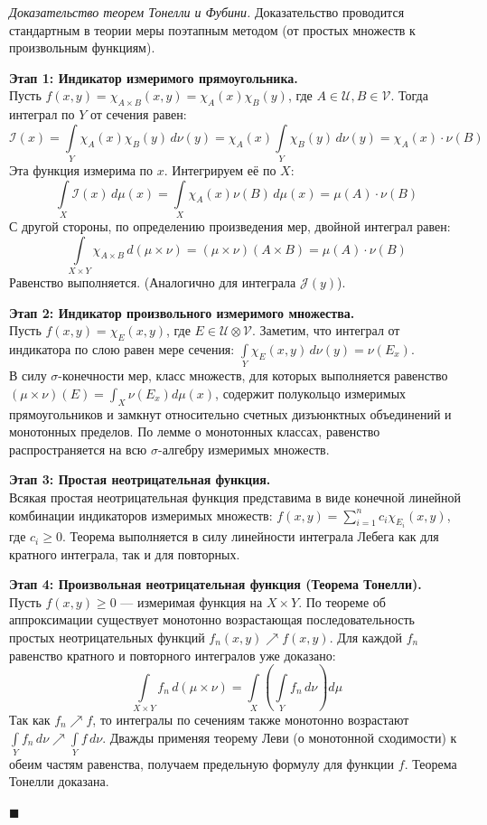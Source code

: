 \documentclass[12pt,a4paper]{article}
\newenvironment{Proof}[1][Доказательство]{\vspace{0.5em}\noindent\textit{#1.}\hspace{0.5em}\ignorespaces}{\hfill$\blacksquare$\vspace{1em}}
\begin{document}
\begin{Proof}[Доказательство теорем Тонелли и Фубини]
Доказательство проводится стандартным в теории меры поэтапным методом (от простых множеств к произвольным функциям).

\textbf{Этап 1: Индикатор измеримого прямоугольника.} \\
Пусть $f(x,y) = \chi_{A \times B}(x,y) = \chi_A(x) \chi_B(y)$, где $A \in \mathcal{U}, B \in \mathcal{V}$. 
Тогда интеграл по $Y$ от сечения равен:
$$ \mathcal{I}(x) = \int\limits_Y \chi_A(x) \chi_B(y) \, d\nu(y) = \chi_A(x) \int\limits_Y \chi_B(y) \, d\nu(y) = \chi_A(x) \cdot \nu(B) $$
Эта функция измерима по $x$. Интегрируем её по $X$:
$$ \int\limits_X \mathcal{I}(x) \, d\mu(x) = \int\limits_X \chi_A(x) \nu(B) \, d\mu(x) = \mu(A) \cdot \nu(B) $$
С другой стороны, по определению произведения мер, двойной интеграл равен:
$$ \int\limits_{X \times Y} \chi_{A \times B} \, d(\mu \times \nu) = (\mu \times \nu)(A \times B) = \mu(A) \cdot \nu(B) $$
Равенство выполняется. (Аналогично для интеграла $\mathcal{J}(y)$).

\textbf{Этап 2: Индикатор произвольного измеримого множества.} \\
Пусть $f(x,y) = \chi_E(x,y)$, где $E \in \mathcal{U} \otimes \mathcal{V}$. Заметим, что интеграл от индикатора по слою равен мере сечения: $\int\limits_Y \chi_E(x,y) \, d\nu(y) = \nu(E_x)$. \\
В силу $\sigma$-конечности мер, класс множеств, для которых выполняется равенство $(\mu \times \nu)(E) = \int_X \nu(E_x) d\mu(x)$, содержит полукольцо измеримых прямоугольников и замкнут относительно счетных дизъюнктных объединений и монотонных пределов. По лемме о монотонных классах, равенство распространяется на всю $\sigma$-алгебру измеримых множеств.

\textbf{Этап 3: Простая неотрицательная функция.} \\
Всякая простая неотрицательная функция представима в виде конечной линейной комбинации индикаторов измеримых множеств: $f(x,y) = \sum_{i=1}^n c_i \chi_{E_i}(x,y)$, где $c_i \ge 0$. Теорема выполняется в силу линейности интеграла Лебега как для кратного интеграла, так и для повторных.

\textbf{Этап 4: Произвольная неотрицательная функция (Теорема Тонелли).} \\
Пусть $f(x,y) \ge 0$ — измеримая функция на $X \times Y$. По теореме об аппроксимации существует монотонно возрастающая последовательность простых неотрицательных функций $f_n(x,y) \nearrow f(x,y)$.
Для каждой $f_n$ равенство кратного и повторного интегралов уже доказано:
$$ \int\limits_{X \times Y} f_n \, d(\mu \times \nu) = \int\limits_X \left( \int\limits_Y f_n \, d\nu \right) d\mu $$
Так как $f_n \nearrow f$, то интегралы по сечениям также монотонно возрастают $\int\limits_Y f_n \, d\nu \nearrow \int\limits_Y f \, d\nu$. 
Дважды применяя теорему Леви (о монотонной сходимости) к обеим частям равенства, получаем предельную формулу для функции $f$. Теорема Тонелли доказана.


\end{Proof}
\end{document}
